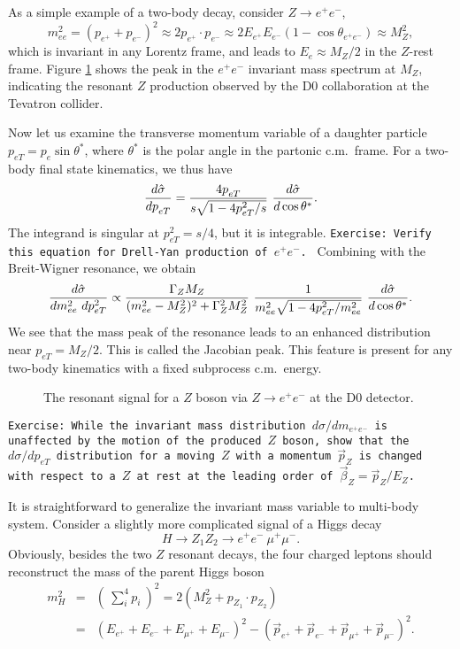 \documentclass[prd,aps,floats,preprintnumbers,preprint,superscriptaddress,floatfix,nofootinbib]{revtex4}
\def\epem{e^+e^-}
\def\be{\begin{equation}}
\def\ee{\end{equation}}
\def\bea{\begin{eqnarray}}
\def\eea{\end{eqnarray}}
\begin{document}
As a simple example of a two-body decay, consider  $Z\to \epem$,
\be 
m_{ee}^2  = (p_{e^+} + p_{e^-})^2
\approx 2 p_{e^+} \cdot p_{e^-} \approx  2E_{e^+} E_{e^-} (1-\cos\theta_{\epem})
\approx M_Z^2,
\ee
which is invariant in any Lorentz frame, and leads to $E_e \approx M_Z/2$
in the $Z$-rest frame. Figure \ref{Zee} shows the peak 
in the $\epem$ invariant mass spectrum at $M_Z$, indicating the
resonant $Z$ production observed by the D0 collaboration \cite{d0} 
at the Tevatron collider.

Now let us examine the transverse momentum variable of a daughter
particle $p_{eT}^{}=p_e \sin\theta^*$, where $\theta^*$ is the polar angle
in the partonic c.m.~frame.  For a two-body final state kinematics, 
we thus have
\be
{d\hat\sigma\over dp_{eT}^{} } = {4p^{}_{eT} \over s \sqrt{1-4p_{eT}^2/s}}\ 
{d\hat\sigma\over d\cos\theta^* }.
\ee
The integrand is singular at  $p_{eT}^2 = s/4$, but it is integrable.
{
\vskip 0.2cm
\noindent
\tt Exercise: Verify this equation for  Drell-Yan production of $\epem$.
\vskip 0.2cm
}
\noindent
Combining with the Breit-Wigner resonance, we obtain
\be
{d\hat\sigma\over dm_{ee}^2\ dp_{eT}^2 } \propto
\frac{\Gamma_ZM_Z}{ (m^2_{ee}-M^2_Z)^2 + \Gamma_Z^2 M_Z^2}\ 
{1 \over m_{ee}^2\sqrt{1-4p_{eT}^2/m_{ee}^2}}\  {d\hat\sigma\over d\cos\theta^* }.
\ee
We see that the mass peak of the resonance leads to an enhanced
distribution near  $p_{eT}^{} = M_Z^{}/2$. This is called the Jacobian peak. 
This feature is present for any two-body kinematics with a fixed subprocess 
c.m.~energy. 

\begin{center}
\begin{figure}[tb]
\caption{The resonant signal for a $Z$ boson via $Z\to \epem$
at the D0 detector.}
\label{Zee}
\end{figure}
\end{center}

{
\vskip 0.2cm
\noindent
\tt Exercise: While the invariant mass distribution $d\sigma/dm_{\epem}$ is 
unaffected by the motion of the produced $Z$ boson, show that the 
$d\sigma/ dp_{eT}^{}$ distribution for a moving $Z$ with a momentum $\vec p_Z^{}$ is changed 
 with respect to a $Z$ at rest  at the leading order of $\vec \beta_Z^{} = \vec p_Z^{}/E_Z$.
\vskip 0.2cm
}

It is straightforward to generalize the invariant mass variable to multi-body
system. Consider a slightly more complicated signal of a Higgs decay
\be
H \to Z_1 Z_2 \to \epem\ \mu^+\mu^-.
\ee
Obviously, besides the two $Z$ resonant decays, the four charged
leptons should reconstruct the mass of the parent Higgs boson
\bea
m_H^2 &=& (\ \sum_i^4 p_{i} \ )^2 =  2 (M_Z^2 + p^{}_{Z_1} \cdot p^{}_{Z_2}) \\
 &=& (E_{e^+} + E_{e^-} + E_{\mu^+} + E_{\mu^-})^2
- (\vec p_{e^+} + \vec p_{e^-}  + \vec p_{\mu^+} + \vec p_{\mu^-})^2.
\label{Minv}
\eea
\end{document}
